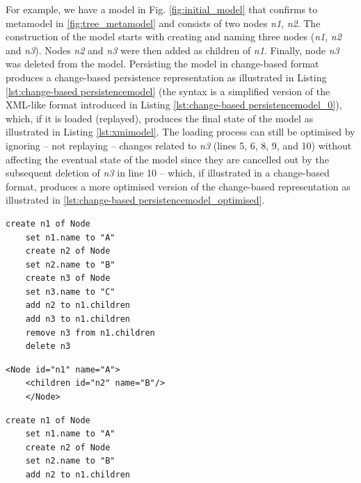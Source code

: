 \documentclass[12pt, a4paper]{report} \usepackage[titletoc]{appendix}
\begin{document}
For example, we have a model in Fig. \ref{fig:initial_model} that confirms to metamodel in \ref{fig:tree_metamodel} and consists of two nodes \emph{n1}, \emph{n2}. The construction of the model starts with creating and naming three nodes (\emph{n1}, \emph{n2} and \emph{n3}). Nodes \emph{n2} and \emph{n3} were then added as children of \emph{n1}. Finally, node \emph{n3} was deleted from the model. Persisting the model in change-based format produces a change-based persistence representation as illustrated in Listing \ref{lst:change-based persistencemodel} (the syntax is a simplified version of the XML-like format introduced in Listing \ref{lst:change-based persistencemodel_0}), which, if it is loaded (replayed), produces the final state of the model as illustrated in Listing \ref{lst:xmimodel}. The loading process can still be optimised by ignoring -- not replaying -- changes related to \emph{n3} (lines 5, 6, 8, 9, and 10) without affecting the eventual state of the model since they are cancelled out by the subsequent deletion of \emph{n3} in line 10 -- which, if illustrated in a change-based format, produces a more optimised version of the change-based representation as illustrated in \ref{lst:change-based persistencemodel_optimised}.

\noindent
\begin{minipage}[t]{0.48\linewidth}
	\begin{lstlisting}[style=eol,caption={Change-based representation of the tree model.},label=lst:change-based persistencemodel]
    create n1 of Node
    set n1.name to "A"      
    create n2 of Node
    set n2.name to "B"      
    create n3 of Node
    set n3.name to "C"      
    add n2 to n1.children   
    add n3 to n1.children
    remove n3 from n1.children   
    delete n3
    \end{lstlisting}
\end{minipage}
\hfill
\begin{minipage}[t]{0.48\linewidth}
	\begin{lstlisting}[style=xmi,caption={State-based representation of the tree model in (simplified) XMI.},label=lst:xmimodel]
    <Node id="n1" name="A">
    <children id="n2" name="B"/>
    </Node>
    \end{lstlisting}
    
    \begin{lstlisting}[style=eol,caption={An optimised version of change-based representation in Listing \ref{lst:change-based persistencemodel}.},label=lst:change-based persistencemodel_optimised]
    create n1 of Node
    set n1.name to "A"
    create n2 of Node
    set n2.name to "B"
    add n2 to n1.children
    \end{lstlisting}
\end{minipage}
\end{document}
